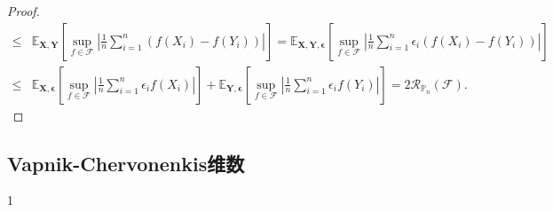 \begin{proof}
\begin{align*}
		\leq & \mathbb{E}_{\bm X, \bm Y} \left[ \sup_{f \in \mathscr{F}} \left|  \frac{1}{n} \sum_{i=1}^n \left( f(X_i) - f(Y_i) \right) \right| \right]
		=  \mathbb{E}_{\bm X, \bm Y, \bm \epsilon} \left[ \sup_{f \in \mathscr{F}} \left|  \frac{1}{n} \sum_{i=1}^n \epsilon_i \left( f(X_i) - f(Y_i) \right) \right| \right] \\
		\leq & \mathbb{E}_{\bm X, \bm \epsilon}  \left[ \sup_{f \in \mathscr{F}} \left|  \frac{1}{n} \sum_{i=1}^n \epsilon_i f(X_i) \right| \right] + \mathbb{E}_{\bm Y, \bm \epsilon}  \left[ \sup_{f \in \mathscr{F}} \left|  \frac{1}{n} \sum_{i=1}^n \epsilon_i f(Y_i) \right| \right]
		= 2 \mathcal{R}_{\mathbb{P}_n}(\mathscr{F}). 
	\end{align*}
	
\end{proof}























\subsection{Vapnik-Chervonenkis维数}































1